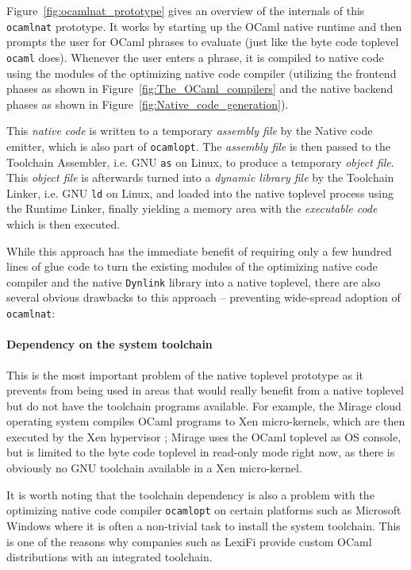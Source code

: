 \documentclass[10pt,a4paper,final,twocolumn]{article}
\makeatletter
\newcommand{\ie}{i.e.\@\xspace}
\makeatother
\begin{document}
Figure~\ref{fig:ocamlnat_prototype} gives an overview of the internals of this \texttt{ocamlnat} prototype.
It works by starting up the OCaml native runtime and then prompts the user for OCaml phrases to evaluate
(just like the byte code toplevel \texttt{ocaml} does). Whenever the user enters a phrase, it is compiled
to native code using the modules of the optimizing native code compiler (utilizing the frontend phases as
shown in Figure~\ref{fig:The_OCaml_compilers} and the native backend phases as shown in
Figure~\ref{fig:Native_code_generation}).

This \emph{native code} is written to a temporary \emph{assembly file} by the Native code emitter, which
is also part of \texttt{ocamlopt}. The \emph{assembly file} is then passed to the Toolchain Assembler, \ie GNU
\texttt{as} on Linux, to produce a temporary \emph{object file}. This \emph{object file} is afterwards turned
into a \emph{dynamic library file} by the Toolchain Linker, \ie GNU \texttt{ld} on Linux, and loaded into the
native toplevel process using the Runtime Linker, finally yielding a memory area with the \emph{executable code}
which is then executed.

While this approach has the immediate benefit of requiring only a few hundred lines of glue code to turn
the existing modules of the optimizing native code compiler and the native \texttt{Dynlink} library into
a native toplevel, there are also several obvious drawbacks to this approach -- preventing wide-spread
adoption of \texttt{ocamlnat}:

\paragraph{Dependency on the system toolchain}

This is the most important problem of the native toplevel prototype as it prevents from being
used in areas that would really benefit from a native toplevel but do not have the toolchain programs
available. For example, the Mirage cloud operating system \cite{Mirage11,Madhavapeddy10,Madhavapeddy10hotcloud}
compiles OCaml programs to Xen micro-kernels, which are then executed by the Xen hypervisor \cite{Xen11}; Mirage uses
the OCaml toplevel as OS console, but is limited to the byte code toplevel in read-only mode right now, as
there is obviously no GNU toolchain available in a Xen micro-kernel.

It is worth noting that the toolchain dependency is also a problem with the optimizing native code compiler
\texttt{ocamlopt} on certain platforms such as Microsoft Windows where it is often a non-trivial task to
install the system toolchain. This is one of the reasons why companies such as LexiFi provide custom OCaml
distributions with an integrated toolchain.
\end{document}
